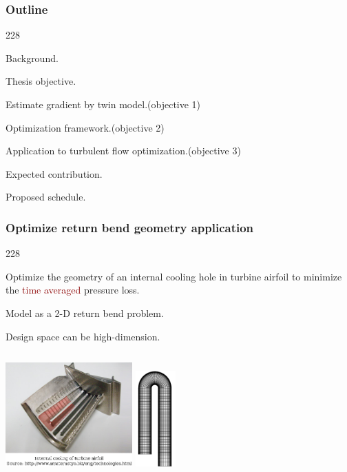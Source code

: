\documentclass{beamer}
\let\oldcite=\cite
\renewcommand{\cite}[1]{\textcolor[rgb]{.4,.4,.85}{\oldcite{#1}}}
\newcommand{\barrow}{\item[\color{darkred}\ding{228}]}
\begin{document}
\begin{frame}
    \frametitle{Outline}\small
    \begin{dinglist}{228}
        \barrow {} Background.
        \barrow Thesis objective.
        \vspace{.35cm}
        \barrow Estimate gradient by twin model.\hfill(objective 1)
        \barrow Optimization framework.\hfill(objective 2)
        \barrow Application to turbulent flow optimization.\hfill(objective 3)
        \vspace{.35cm}
        \barrow Expected contribution.
        \barrow Proposed schedule.
    \end{dinglist}
\end{frame}


\begin{frame}
    \frametitle{Optimize return bend geometry \hfill \scriptsize{application}}\small
    \begin{dinglist}{228}
        \barrow Optimize the geometry of an internal cooling hole in turbine airfoil to minimize the 
                \textcolor{darkred}{time averaged} pressure loss.
        \scriptsize \cite{Coletti 13}\small
        \barrow Model as a 2-D return bend problem.
        \barrow Design space can be high-dimension.
    \end{dinglist}
    \begin{columns}
            \centering
            \includegraphics[height=4cm]{ubend.png}
            \centering
            \includegraphics[height=3.7cm]{overall_mesh.png}
    \end{columns}
\end{frame}
\end{document}
